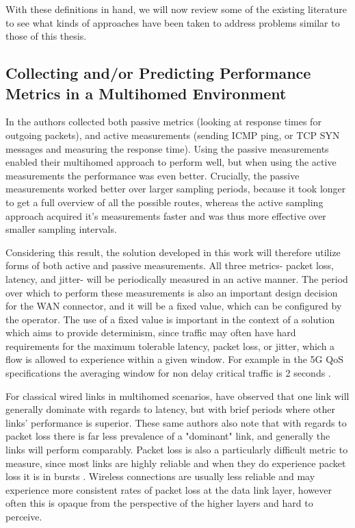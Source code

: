With these definitions in hand, we will now review some of the existing literature to see what kinds of approaches have been taken to address problems similar to those of this thesis.

\subsection{Collecting and/or Predicting Performance Metrics in a Multihomed Environment}

In \cite{akella2008performance} the authors collected both passive metrics (looking at response times for outgoing packets), and active measurements (sending ICMP ping, or TCP SYN messages and measuring the response time). Using the passive measurements enabled their multihomed approach to perform well, but when using the active measurements the performance was even better. Crucially, the passive measurements worked better over larger sampling periods, because it took longer to get a full overview of all the possible routes, whereas the active sampling approach acquired it's measurements faster and was thus more effective over smaller sampling intervals.

Considering this result, the solution developed in this work will therefore utilize forms of both active and passive measurements. All three metrics- packet loss, latency, and jitter- will be periodically measured in an active manner. The period over which to perform these measurements is also an important design decision for the WAN connector, and it will be a fixed value, which can be configured by the operator. The use of a fixed value is important in the context of a solution which aims to provide determinism, since traffic may often have hard requirements for the maximum tolerable latency, packet loss, or jitter, which a flow is allowed to experience within a given window. For example in the 5G QoS specifications the averaging window for non delay critical traffic is 2 seconds \cite{3gpp.23.501}.

For classical wired links in multihomed scenarios, \cite{tao2004exploring} have observed that one link will generally dominate with regards to latency, but with brief periods where other links' performance is superior. These same authors also note that with regards to packet loss there is far less prevalence of a "dominant" link, and generally the links will perform comparably. Packet loss is also a particularly difficult metric to measure, since most links are highly reliable and when they do experience packet loss it is in bursts \cite{tao2004exploring}. Wireless connections are usually less reliable and may experience more consistent rates of packet loss at the data link layer, however often this is opaque from the perspective of the higher layers and hard to perceive.

